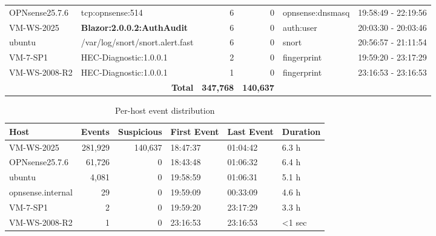 \begin{table}[hbtp]
\begin{tabular}{|l|l|r|r|l|l|}
OPNsense25.7.6 & tcp:opnsense:514 & 6 & 0 & opnsense:dnsmasq & 19:58:49 - 22:19:56 \\
VM-WS-2025 & \textbf{Blazor:2.0.0.2:AuthAudit} & 6 & 0 & auth:user & 20:03:30 - 20:03:46 \\
ubuntu & /var/log/snort/snort.alert.fast & 6 & 0 & snort & 20:56:57 - 21:11:54 \\
VM-7-SP1 & HEC-Diagnostic:1.0.0.1 & 2 & 0 & fingerprint & 19:59:20 - 23:17:29 \\
VM-WS-2008-R2 & HEC-Diagnostic:1.0.0.1 & 1 & 0 & fingerprint & 23:16:53 - 23:16:53 \\
\hline
\multicolumn{2}{|r|}{\textbf{Total}} & \textbf{347,768} & \textbf{140,637} & & \\
\hline
\end{tabular}
\end{table}

\begin{table}[hbtp]
\caption{Per-host event distribution}
\label{tab:export_22Dec2025_010633_host}
\centering
\scriptsize
\begin{tabular}{|l|r|r|l|l|l|}
\hline
\textbf{Host} & \textbf{Events} & \textbf{Suspicious} & \textbf{First Event} & \textbf{Last Event} & \textbf{Duration} \\
\hline
VM-WS-2025 & 281,929 & 140,637 & 18:47:37 & 01:04:42 & 6.3 h \\
OPNsense25.7.6 & 61,726 & 0 & 18:43:48 & 01:06:32 & 6.4 h \\
ubuntu & 4,081 & 0 & 19:58:59 & 01:06:31 & 5.1 h \\
opnsense.internal & 29 & 0 & 19:59:09 & 00:33:09 & 4.6 h \\
VM-7-SP1 & 2 & 0 & 19:59:20 & 23:17:29 & 3.3 h \\
VM-WS-2008-R2 & 1 & 0 & 23:16:53 & 23:16:53 & <1 sec \\
\hline
\end{tabular}
\end{table}

